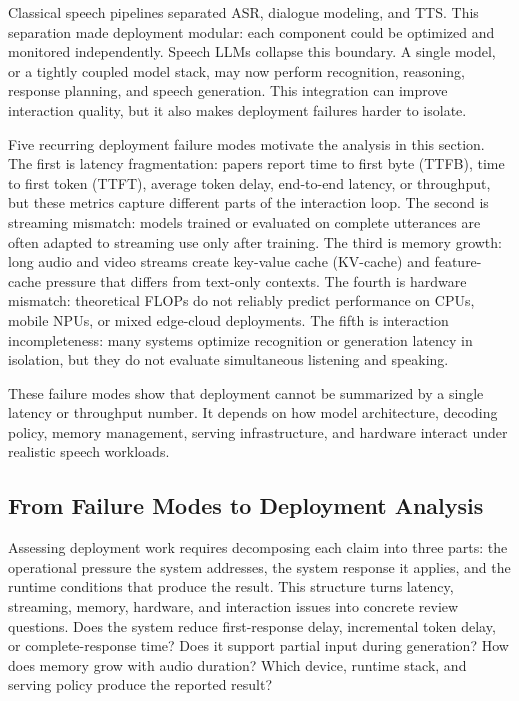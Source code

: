 Classical speech pipelines separated ASR, dialogue modeling, and TTS. This separation made deployment modular: each component could be optimized and monitored independently. Speech LLMs collapse this boundary. A single model, or a tightly coupled model stack, may now perform recognition, reasoning, response planning, and speech generation. This integration can improve interaction quality, but it also makes deployment failures harder to isolate.

Five recurring deployment failure modes motivate the analysis in this section. The first is latency fragmentation: papers report time to first byte (TTFB), time to first token (TTFT), average token delay, end-to-end latency, or throughput, but these metrics capture different parts of the interaction loop. The second is streaming mismatch: models trained or evaluated on complete utterances are often adapted to streaming use only after training. The third is memory growth: long audio and video streams create key-value cache (KV-cache) and feature-cache pressure that differs from text-only contexts. The fourth is hardware mismatch: theoretical FLOPs do not reliably predict performance on CPUs, mobile NPUs, or mixed edge-cloud deployments. The fifth is interaction incompleteness: many systems optimize recognition or generation latency in isolation, but they do not evaluate simultaneous listening and speaking.

These failure modes show that deployment cannot be summarized by a single latency or throughput number. It depends on how model architecture, decoding policy, memory management, serving infrastructure, and hardware interact under realistic speech workloads.

\subsection{From Failure Modes to Deployment Analysis}

Assessing deployment work requires decomposing each claim into three parts: the operational pressure the system addresses, the system response it applies, and the runtime conditions that produce the result. This structure turns latency, streaming, memory, hardware, and interaction issues into concrete review questions. Does the system reduce first-response delay, incremental token delay, or complete-response time? Does it support partial input during generation? How does memory grow with audio duration? Which device, runtime stack, and serving policy produce the reported result?


